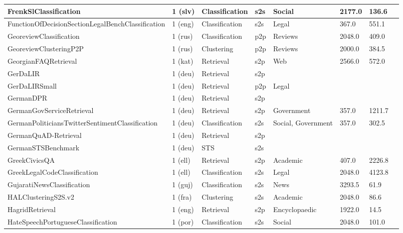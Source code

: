 \begin{longtable}{L{5.0cm}|L{1.5cm}L{1.4cm}L{1.4cm}L{1.4cm}L{1.4cm}L{1.0cm}L{1.0cm}}
 \hline 
FrenkSlClassification \cite{ljubešić2019frenk} & 1 (slv) & Classification & s2s & Social & 2177.0 & 136.6 \\
 \hline 
FunctionOfDecisionSectionLegalBenchClassification \cite{guha2023legalbench} & 1 (eng) & Classification & s2s & Legal & 367.0 & 551.1 \\
 \hline 
GeoreviewClassification  & 1 (rus) & Classification & p2p & Reviews & 2048.0 & 409.0 \\
 \hline 
GeoreviewClusteringP2P  & 1 (rus) & Clustering & p2p & Reviews & 2000.0 & 384.5 \\
 \hline 
GeorgianFAQRetrieval  & 1 (kat) & Retrieval & s2p & Web & 2566.0 & 572.0 \\
 \hline 
GerDaLIR \cite{wrzalik-krechel-2021-gerdalir} & 1 (deu) & Retrieval & s2p &  &  &  \\
 \hline 
GerDaLIRSmall \cite{wrzalik-krechel-2021-gerdalir} & 1 (deu) & Retrieval & p2p & Legal &  &  \\
 \hline 
GermanDPR \cite{möller2021germanquad} & 1 (deu) & Retrieval & s2p &  &  &  \\
 \hline 
GermanGovServiceRetrieval \cite{lhm-dienstleistungen-qa} & 1 (deu) & Retrieval & s2p & Government & 357.0 & 1211.7 \\
 \hline 
GermanPoliticiansTwitterSentimentClassification \cite{schmidt-etal-2022-sentiment} & 1 (deu) & Classification & s2s & Social, Government & 357.0 & 302.5 \\
 \hline 
GermanQuAD-Retrieval  & 1 (deu) & Retrieval & s2p &  &  &  \\
 \hline 
GermanSTSBenchmark \cite{huggingface:dataset:stsb_multi_mt} & 1 (deu) & STS & s2s &  &  &  \\
 \hline 
GreekCivicsQA  & 1 (ell) & Retrieval & s2p & Academic & 407.0 & 2226.8 \\
 \hline 
GreekLegalCodeClassification \cite{papaloukas-etal-2021-glc} & 1 (ell) & Classification & s2s & Legal & 2048.0 & 4123.8 \\
 \hline 
GujaratiNewsClassification  & 1 (guj) & Classification & s2s & News & 3293.5 & 61.9 \\
 \hline 
HALClusteringS2S.v2 \cite{ciancone2024extending} & 1 (fra) & Clustering & s2s & Academic & 2048.0 & 86.6 \\
 \hline 
HagridRetrieval \cite{hagrid} & 1 (eng) & Retrieval & s2p & Encyclopaedic & 1922.0 & 14.5 \\
 \hline 
HateSpeechPortugueseClassification \cite{fortuna-etal-2019-hierarchically} & 1 (por) & Classification & s2s & Social & 2048.0 & 101.0 \\

\end{longtable}
